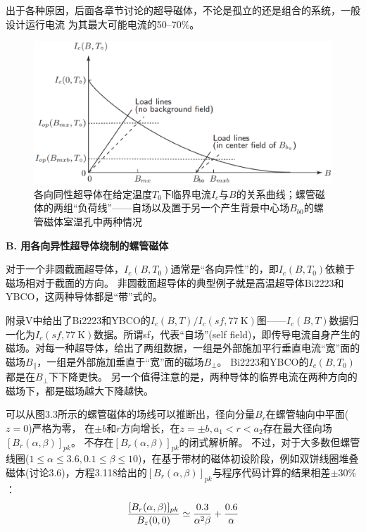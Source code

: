 出于各种原因，后面各章节讨论的超导磁体，不论是孤立的还是组合的系统，一般设计运行电流
为其最大可能电流的50–70\%。

\begin{figure}[htbp]
	\centering
	\includegraphics[scale=0.4]{chpt3/figs/fig3.19.eps}
	\caption{各向同性超导体在给定温度$T_0$下临界电流$I_c$与$B$的关系曲线；螺管磁体的两组“负荷线”——自场以及置于另一个产生背景中心场$B_{b0}$的螺管磁体室温孔中两种情况}
\end{figure}

\textbf{B. 用各向异性超导体绕制的螺管磁体}

对于一个非圆截面超导体，$I_c(B,T_0)$通常是“各向异性”的，即$I_c(B,T_0)$依赖于磁场相对于截面的方向。
非圆截面超导体的典型例子就是高温超导体Bi2223和YBCO，这两种导体都是“带”式的。

附录V中给出了Bi2223和YBCO的$I_c(B, T)/I_c(sf,77\ \mathrm{K})$图——$I_c(B, T)$数据归一化为$I_c(sf,77\ \mathrm{K})$数据。所谓sf，代表“自场”(self field)，即传导电流自身产生的磁场。对每一种超导体，给出了两组数据，一组是外部施加平行垂直电流“宽”面的磁场$B_{\parallel}$，一组是外部施加垂直于“宽”面的磁场$B_{\perp}$。 
Bi2223和YBCO的$I_c(B,T_0)$都是在$B_{\perp}$下下降更快。
另一个值得注意的是，两种导体的临界电流在两种方向的磁场下，都是磁场越大下降越快。

可以从图3.3所示的螺管磁体的场线可以推断出，径向分量$B_r$在螺管轴向中平面($z=0$)严格为零，
在$\pm b$和$r$方向增长，在$z=\pm b,a_1 < r < a_2$存在最大径向场$[B_r(\alpha,\beta)]_{pk}$。
不存在$[B_r(\alpha,\beta)]_{pk}$的闭式解析解。
不过，对于大多数但螺管线圈($1\le \alpha \le 3.6 , 0.1\le \beta \le 10$)，在基于带材的磁体初设阶段，例如双饼线圈堆叠磁体(讨论3.6)，方程3.118给出的$[B_{r}(\alpha,\beta)]_{pk}$与程序代码计算的结果相差$\pm 30\%$：
\begin{equation}
 \frac{[B_{r}(\alpha,\beta)]_{pk}}{B_{z}(0,0)}\simeq\frac{0.3}{\alpha^{2}\beta}+\frac{0.6}{\alpha}\\%
\end{equation}

